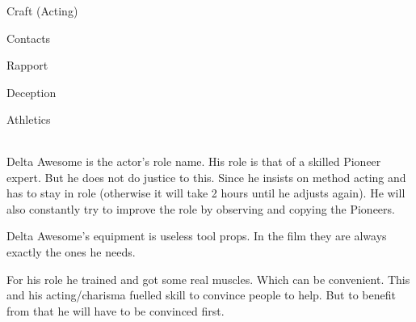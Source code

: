 \begin{npcBox}[title=Delta Awesome - acting the victim]

    \begin{aspects}
    \item {}
    \item {}    
    \item {}    
    \end{aspects}
    
    \begin{skills}
    \item {} Craft (Acting)
    \item {} Contacts
    \item {} Rapport
    \item {} Deception
    \item {} Athletics
    \end{skills}
    
    \begin{stunts}
    \item {}
    \end{stunts}
    
    \begin{stressSection}
    \end{stressSection}
    \begin{tabularx}{\textwidth}{ XX }
    \end{tabularx}
    
    \begin{consequences}
    \item {}
    \item {}
    \item {}
    \end{consequences}
    
    \begin{npcDescription}
    Delta Awesome is the actor's role name. His role is that of a skilled Pioneer expert. But he does not do justice to this. Since he insists on method acting and has to stay in role (otherwise it will take 2 hours until he adjusts again). He will also constantly try to improve the role by observing and copying the Pioneers.
    
    Delta Awesome's equipment is useless tool props. In the film they are always exactly the ones he needs. 

    For his role he trained and got some real muscles. Which can be convenient. This and his acting/charisma fuelled skill to convince people to help. But to benefit from that he will have to be convinced first.
    \end{npcDescription}
    
\end{npcBox}


